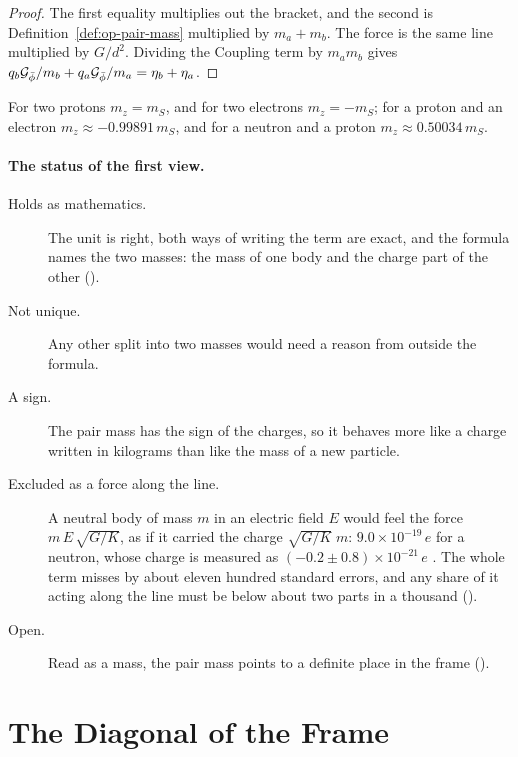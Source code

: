 \begin{proof}
The first equality multiplies out the bracket, and the second is Definition~\ref{def:op-pair-mass} multiplied by $m_a + m_b$. The force is the same line multiplied by $G/d^2$. Dividing the Coupling term by $m_a m_b$ gives $q_b\mathcal{G}_{\bar{\phi}}/m_b + q_a\mathcal{G}_{\bar{\phi}}/m_a = \eta_b + \eta_a$.
\end{proof}

For two protons $m_z = m_S$, and for two electrons $m_z = -m_S$; for a proton and an electron $m_z \approx -0.99891\,m_S$, and for a neutron and a proton $m_z \approx 0.50034\,m_S$.

\paragraph{The status of the first view.}
\begin{description}
  \item[Holds as mathematics.] The unit is right, both ways of writing the term are exact, and the formula names the two masses: the mass of one body and the charge part of the other ().
  \item[Not unique.] Any other split into two masses would need a reason from outside the formula.
  \item[A sign.] The pair mass has the sign of the charges, so it behaves more like a charge written in kilograms than like the mass of a new particle.
  \item[Excluded as a force along the line.] A neutral body of mass $m$ in an electric field $E$ would feel the force $m\,E\,\sqrt{G/K}$, as if it carried the charge $\sqrt{G/K}\;m$: $9.0 \times 10^{-19}\,e$ for a neutron, whose charge is measured as $(-0.2 \pm 0.8) \times 10^{-21}\,e$ \citep{Baumann1988,Bressi2011,PDG2024}. The whole term misses by about eleven hundred standard errors, and any share of it acting along the line must be below about two parts in a thousand ().
  \item[Open.] Read as a mass, the pair mass points to a definite place in the frame ().
\end{description}

\section{The Diagonal of the Frame}\label{sec:op-diagonal}

